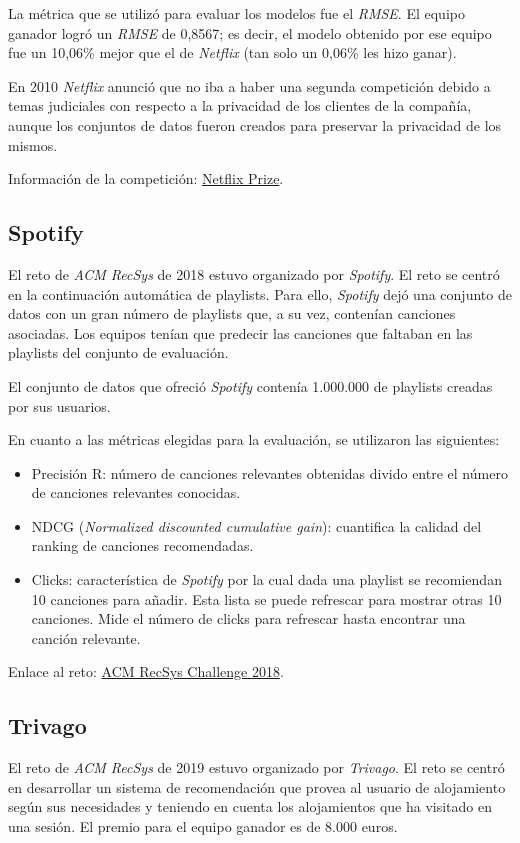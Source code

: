 La métrica que se utilizó para evaluar los modelos fue el \textit{RMSE}. El equipo ganador logró un \textit{RMSE} de 0,8567; es decir, el modelo obtenido por ese equipo fue un 10,06\% mejor que el de \textit{Netflix} (tan solo un 0,06\% les hizo ganar).

En 2010 \textit{Netflix} anunció que no iba a haber una segunda competición debido a temas judiciales con respecto a la privacidad de los clientes de la compañía, aunque los conjuntos de datos fueron creados para preservar la privacidad de los mismos.

Información de la competición: \href{https://www.netflixprize.com/}{Netflix Prize}.

\subsection{Spotify}\label{spotify}
El reto de \textit{ACM RecSys} de 2018 \cite{spotify} estuvo organizado por \textit{Spotify}. El reto se centró en la continuación automática de playlists. Para ello, \textit{Spotify} dejó una conjunto de datos con un gran número de playlists que, a su vez, contenían canciones asociadas. Los equipos tenían que predecir las canciones que faltaban en las playlists del conjunto de evaluación.

El conjunto de datos que ofreció \textit{Spotify} contenía 1.000.000 de playlists creadas por sus usuarios.

En cuanto a las métricas elegidas para la evaluación, se utilizaron las siguientes:
\begin{itemize}
\tightlist
\item Precisión R: número de canciones relevantes obtenidas divido entre el número de canciones relevantes conocidas.
\item NDCG (\textit{Normalized discounted cumulative gain}): cuantifica la calidad del ranking de canciones recomendadas.
\item Clicks: característica de \textit{Spotify} por la cual dada una playlist se recomiendan 10 canciones para añadir. Esta lista se puede refrescar para mostrar otras 10 canciones. Mide el número de clicks para refrescar hasta encontrar una canción relevante.
\end{itemize}

Enlace al reto: \href{http://www.recsyschallenge.com/2018/}{ACM RecSys Challenge 2018}.

\subsection{Trivago}\label{trivago}
El reto de \textit{ACM RecSys} de 2019 \cite{trivago} estuvo organizado por \textit{Trivago}. El reto se centró en desarrollar un sistema de recomendación que provea al usuario de alojamiento según sus necesidades y teniendo en cuenta los alojamientos que ha visitado en una sesión. El premio para el equipo ganador es de 8.000 euros.

